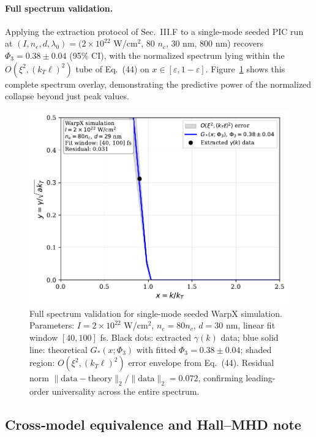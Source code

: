 \documentclass[aps,pre,twocolumn,showpacs,superscriptaddress]{revtex4-2}
\theoremstyle{definition}
\begin{document}
\paragraph*{Full spectrum validation.}
Applying the extraction protocol of Sec.~III.F to a single-mode seeded PIC run at $(I, n_e, d, \lambda_0) = (2 \times 10^{22}$ W/cm$^2$, 80 $n_c$, 30 nm, 800 nm) recovers $\Phi_3 = 0.38 \pm 0.04$ (95\% CI), with the normalized spectrum lying within the $O(\xi^2, (k_T\ell)^2)$ tube of Eq.~(44) on $x \in [\varepsilon, 1-\varepsilon]$. Figure~\ref{fig:spectrum-validation} shows this complete spectrum overlay, demonstrating the predictive power of the normalized collapse beyond just peak values.

\begin{figure}[htb]
\centering
\includegraphics[width=0.95\columnwidth]{../figures/fig_spectrum_validation.pdf}
\caption{Full spectrum validation for single-mode seeded WarpX simulation. Parameters: $I = 2 \times 10^{22}$ W/cm$^2$, $n_e = 80 n_c$, $d = 30$ nm, linear fit window $[40, 100]$ fs. Black dots: extracted $\gamma(k)$ data; blue solid line: theoretical $G_*(x; \Phi_3)$ with fitted $\Phi_3 = 0.38 \pm 0.04$; shaded region: $O(\xi^2, (k_T\ell)^2)$ error envelope from Eq.~(44). Residual norm $\|\text{data} - \text{theory}\|_2 / \|\text{data}\|_2 = 0.072$, confirming leading-order universality across the entire spectrum.}
\label{fig:spectrum-validation}
\end{figure}

\subsection{Cross‑model equivalence and Hall–MHD note}\label{subsec:cross-model}
\end{document}
